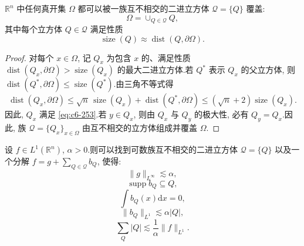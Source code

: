 \begin{lemma}[Whitney 分解]\label{lem:c6-6.7}
$\mathbb{R}^n$ 中任何真开集 $\Omega$ 都可以被一族互不相交的二进立方体 $\mathcal{Q} = \{Q\}$ 覆盖:
\[
\Omega = \cup_{Q \in \mathcal{Q}} Q,
\]
其中每个立方体 $Q \in \mathcal{Q}$ 满足性质
\begin{equation}
\operatorname{size}(Q) \approx \operatorname{dist}(Q, \partial \Omega).\label{eq:c6-253}
\end{equation}
\end{lemma}

\begin{proof}
对每个 $x \in \Omega$, 记 $Q_x$ 为包含 $x$ 的、满足性质 $\operatorname{dist}(Q_x, \partial \Omega) > \operatorname{size}(Q_x)$ 的最大二进立方体.若 $Q^*$ 表示 $Q_x$ 的父立方体, 则 $\operatorname{dist}(Q^*, \partial \Omega) \leq \operatorname{size}(Q^*)$.由三角不等式得
\[
\operatorname{dist}(Q_x, \partial \Omega) \leq \sqrt{n}\, \operatorname{size}(Q_x) + \operatorname{dist}(Q^*, \partial \Omega) \leq (\sqrt{n} + 2) \operatorname{size}(Q_x).
\]
因此, $Q_x$ 满足 \eqref{eq:c6-253}.若 $y \in Q_x$, 则由 $Q_x$ 与 $Q_y$ 的极大性, 必有 $Q_y = Q_x$.因此, 族 $\mathcal{Q} = \{Q_x\}_{x \in \Omega}$ 由互不相交的立方体组成并覆盖 $\Omega$.
\end{proof}

\begin{proposition}\label{prop:c6-6.8}
设 $f \in L^1(\mathbb{R}^n)$, $\alpha > 0$.则可以找到可数族互不相交的二进立方体 $\mathcal{Q} = \{Q\}$ 以及一个分解 $f = g + \sum_{Q \in \mathcal{Q}} b_Q$, 使得:
\begin{equation}
\|g\|_{L^\infty} \lesssim \alpha, \tag{254a}\label{eq:c6-254a}
\end{equation}
\begin{equation}
\operatorname{supp} b_Q \subseteq Q, \tag{254b}\label{eq:c6-254b}
\end{equation}
\begin{equation}
\int b_Q (x) \mathrm{d}x = 0, \tag{254c}\label{eq:c6-254c}
\end{equation}
\begin{equation}
\|b_Q\|_{L^1} \lesssim \alpha |Q|, \tag{254d}\label{eq:c6-254d}
\end{equation}
\begin{equation}
\sum_Q |Q| \lesssim \frac{1}{\alpha} \|f\|_{L^1}.\tag{254e}\label{eq:c6-254e}
\end{equation}
\end{proposition}

